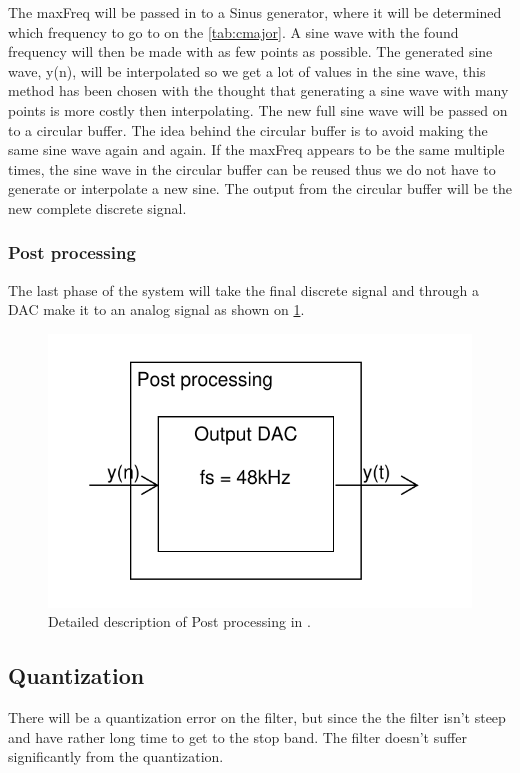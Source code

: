 The maxFreq will be passed in to a Sinus generator, where it will be determined which frequency to go to on the \cref{tab:cmajor}. A sine wave with the found frequency will then be made with as few points as possible. The generated sine wave, y(n), will be interpolated so we get a lot of values in the sine wave, this method has been chosen with the thought that generating a sine wave with many points is more costly then interpolating. The new full sine wave will be passed on to a circular buffer. The idea behind the circular buffer is to avoid making the same sine wave again and again. If the maxFreq appears to be the same multiple times, the sine wave in the circular buffer can be reused thus we do not have to generate or interpolate a new sine. The output from the circular buffer will be the new complete discrete signal.

\subsubsection{Post processing}
The last phase of the system will take the final discrete signal and through a DAC make it to an analog signal as shown on \cref{fig:DetailedPostPro}.
\begin{figure}
	\centering
	\includegraphics[width=1\linewidth]{gfx/Design/DesignPostPro_IF.pdf}
	\caption{Detailed description of Post processing in \systemName.}
	\label{fig:DetailedPostPro}
\end{figure}

\subsection{Quantization} 
There will be a quantization error on the filter, but since the the filter isn't steep and have rather long time to get to the stop band. The filter doesn't suffer significantly from the quantization.  

